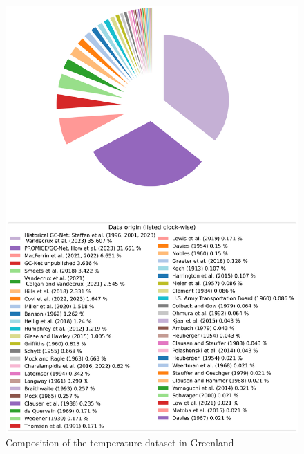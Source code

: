 \documentclass[journal abbreviation, manuscript]{copernicus}
\begin{document}
\begin{figure}[!htb]
\caption{Composition of the temperature dataset in Greenland}
\centering
\includegraphics[scale=0.4]{figures/temperature_dataset_composition_greenland.png}
\end{figure}
\end{document}
